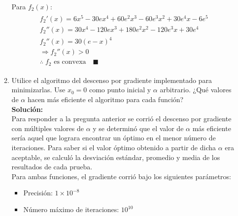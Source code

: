 \documentclass[10pt,letterpaper]{article}
\begin{document}
\begin{enumerate}
\begin{enumerate}
                    Para $f_2(x)$:
                    \begin{equation*} \begin{split} \begin{gathered}
                        f_2'(x) =  6 x^5  - 30 e x^4  + 60 e^2 x^3  - 60 e^3 x^2 + 30 e^4 x - 6 e^5  \\
                        f_2''(x) = 30 x^4 - 120 e x^3 + 180 e^2 x^2 - 120 e^3 x  + 30 e^4 \\
                        f_2''(x) = 30(e - x)^4 \\
                        \Rightarrow f_2''(x) > 0 \\
                        \therefore \; f_2 \text{ es convexa} \quad \blacksquare
                    \end{gathered} \end{split} \end{equation*}

                \item Utilice el algoritmo del descenso por gradiente implementado
                para minimizarlas. Use $x_0 = 0$ como punto inicial y $\alpha$
                arbitrario. ¿Qué valores de $\alpha$ hacen más eficiente el algoritmo
                para cada función? \\

                    \textbf{Solución:} \\
                    Para responder a la pregunta anterior se corrió el
                    descenso por gradiente con múltiples valores de $\alpha$
                    y se determinó que el valor de $\alpha$ más eficiente sería
                    aquel que lograra encontrar un óptimo en el menor número
                    de iteraciones. Para saber si el valor óptimo obtenido
                    a partir de dicha $\alpha$ era aceptable, se calculó la
                    desviación estándar, promedio y media de los resultados
                    de cada prueba. \\

                    Para ambas funciones, el gradiente corrió bajo los
                    siguientes parámetros:

                        \begin{itemize}
                            \item Precisión: $1 \times 10^{-8}$
                            \item Número máximo de iteraciones: $10^{10}$
                        \end{itemize}


\end{enumerate}
\end{enumerate}
\end{document}
